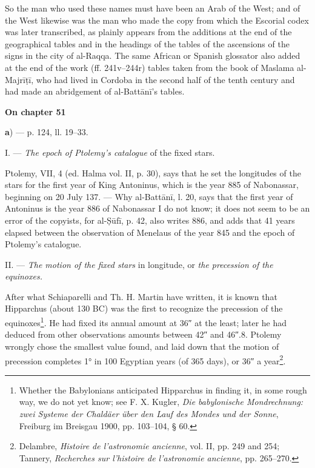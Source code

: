 \documentclass[11pt]{article}
\newcommand{\Pg}[1]{\marginpar{\footnotesize\color{gray}#1}}
\newcommand{\UnitHead}[2]{\par\setcounter{footnoteT}{0}\needspace{8\baselineskip}\bigskip\pdfbookmark[1]{#1}{unit-#2}\hypertarget{EN-#2}{}%
 {\large\bfseries\interlinepenalty=10000 #1\par}\nobreak\medskip}
\begin{document}
\par \Pg{I 292}So the man who used these names must have been an Arab of the West; and of the West likewise was the man who made the copy from which the Escorial codex was later transcribed, as plainly appears from the additions at the end of the geographical tables and in the headings of the tables of the ascensions of the signs in the city of al-Raqqa. The same African or Spanish glossator also added at the end of the work (ff. 241v–244r) tables taken from the book of Maslama al-Majrīṭī, who had lived in Cordoba in the second half of the tenth century and had made an abridgement of al-Battānī's tables.\par
\UnitHead{On chapter 51}{A51}
\par\begin{center}\textbf{a}) — p. 124, ll. 19–33.\end{center}
\par I. — \emph{The epoch of Ptolemy's catalogue} of the fixed stars.\par
\par Ptolemy, VII, 4 (ed. Halma vol. II, p. 30), says that he set the longitudes of the stars for the first year of King Antoninus, which is the year 885 of Nabonassar, beginning on 20 July 137. — Why al-Battānī, l. 20, says that the first year of Antoninus is the year 886 of Nabonassar I do not know; it does not seem to be an error of the copyists, for al-Ṣūfī, p. 42, also writes 886, and adds that 41 years elapsed between the observation of Menelaus of the year 845 and the epoch of Ptolemy's catalogue.\par
\par II. — \emph{The motion of the fixed stars} in longitude, or \emph{the precession of the equinoxes.}\par
\par After what Schiaparelli and Th. H. Martin have written, it is known that Hipparchus (about 130 BC) was the first to recognize the precession of the equinoxes\footnote{Whether the Babylonians anticipated Hipparchus in finding it, in some rough way, we do not yet know; see F. X. Kugler, \emph{Die babylonische Mondrechnung: zwei Systeme der Chaldäer über den Lauf des Mondes und der Sonne}, Freiburg im Breisgau 1900, pp. 103–104, § 60.}. He had fixed its annual amount at 36″ at the least; later he had deduced from other observations amounts between 42″ and 46″.8. Ptolemy wrongly chose the smallest value found, and laid down that the motion of precession completes 1° in 100 Egyptian years (of 365 days), or 36″ a year\footnote{Delambre, \emph{Histoire de l'astronomie ancienne}, vol. II, pp. 249 and 254; Tannery, \emph{Recherches sur l'histoire de l'astronomie ancienne}, pp. 265–270.}.\par
\end{document}
